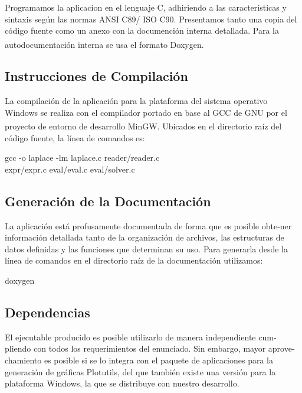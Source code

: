 \documentclass[a4paper]{article}
\let\originalcite\cite
\renewcommand{\cite}[2][]{\textsuperscript{\originalcite{#2}}}
\begin{document}
Programamos la aplicacion en el lenguaje C, adhiriendo a las 
características y sintaxis según las normas ANSI C89/ ISO C90. 
Presentamos tanto una copia del código fuente 
como un anexo con la documención interna detallada. Para la 
autodocumentación interna se usa el formato Doxygen\cite{bib:doxy}.

\subsection{Instrucciones de Compilación}

La compilación de la aplicación para la plataforma del
sistema operativo Windows se realiza con el compilador portado 
en base al GCC de GNU por el proyecto de entorno de desarrollo 
MinGW\cite{bib:mingw}. Ubicados en el directorio raíz del código 
fuente, la línea de comandos es:

\begin{center}\ttfamily 
    gcc -o laplace -lm laplace.c reader/reader.c \\
    expr/expr.c eval/eval.c eval/solver.c 
\end{center}

\subsection{Generación de la Documentación}

La aplicación está profusamente documentada de forma que 
es posible obte-ner información detallada tanto de la 
organización de archivos, las estructuras de datos definidas
y las funciones que determinan su uso. Para generarla desde 
la línea de comandos en el directorio raíz de la documentación
utilizamos:

\begin{center}\ttfamily 
    doxygen 
\end{center}

\subsection{Dependencias}

El ejecutable producido es posible utilizarlo de manera 
independiente cum-pliendo con todos los requerimientos del 
enunciado. Sin embargo, mayor aprove-chamiento es posible
si se lo integra con el paquete de aplicaciones para la 
generación de gráficas Plotutils, del que también existe
una versión para la plataforma Windows, la que se distribuye
con nuestro desarrollo. 
\end{document}
